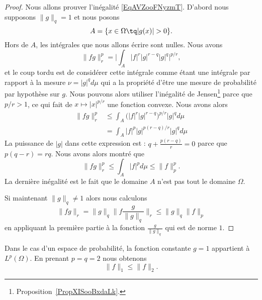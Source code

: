 \begin{proof}
    Nous allons prouver l'inégalité \eqref{EqAVZooFNyzmT}. D'abord nous supposons \( \| g \|_q=1\) et nous posons
    \begin{equation}
        A=\{ x\in\Omega\tq | g(x) |>0 \}.
    \end{equation}
    Hors de \( A\), les intégrales que nous allons écrire sont nulles. Nous avons
    \begin{equation}
        \| fg \|_r^p=\Big|  \int_A| f |^r| g |^{r-q}| g |^q  \Big|^{p/r},
    \end{equation}
    et le coup tordu est de considérer cette intégrale comme étant une intégrale par rapport à la mesure \( \nu=| g |^qd\mu\) qui a la propriété d'être une mesure de probabilité par hypothèse sur \( g\). Nous pouvons alors utiliser l'inégalité de Jensen\footnote{Proposition~\ref{PropXISooBxdaLk}.} parce que \( p/r>1\), ce qui fait de \( x\mapsto | x |^{p/r}\) une fonction convexe. Nous avons alors
    \begin{subequations}
        \begin{align}
            \| fg \|_r^p&\leq\int_A\big( | f |^r| g |^{r-q} \big)^{p/r}| g |^qd\mu\\
            &=\int_A| f |^{p}| g |^{p(r-q)/r}| g |^qd\mu
        \end{align}
    \end{subequations}
    La puissance de \( | g |\) dans cette expression est : \( q+\frac{ p(r-q) }{ r }=0\) parce que \( p(q-r)=rq\). Nous avons alors montré que
    \begin{equation}
        \| fg \|_r^p\leq \int_A| f |^pd\mu\leq \| f \|_p^p.
    \end{equation}
    La dernière inégalité est le fait que le domaine \( A\) n'est pas tout le domaine \( \Omega\).

    Si maintenant \( \| g \|_q\neq 1\) alors nous calculons
    \begin{equation}
        \| fg \|_r=\| g \|_q\| f\frac{ g }{ \| g \|_q } \|_r\leq \| g \|_q\| f \|_p
    \end{equation}
    en appliquant la première partie à la fonction \( \frac{ g }{ \| g \|_q }\) qui est de norme \( 1\).
\end{proof}


\begin{remark}      \label{RemNormuptNird}
    Dans le cas d'un espace de probabilité, la fonction constante \( g=1\) appartient à \( L^p(\Omega)\). En prenant \( p=q=2\) nous obtenons
    \begin{equation}
        \| f \|_1\leq\| f \|_2.
    \end{equation}
\end{remark}

